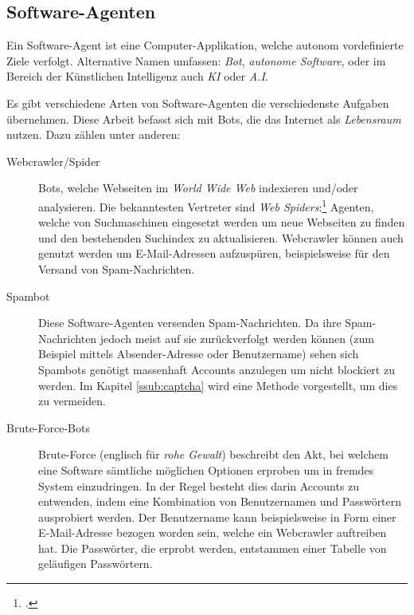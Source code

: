 \subsection{Software-Agenten} %
\label{sub:software_agenten}
Ein Software-Agent ist eine Computer-Applikation, welche autonom vordefinierte
Ziele verfolgt. Alternative Namen umfassen: \emph{Bot}, \emph{autonome
Software}, oder im Bereich der Künstlichen Intelligenz auch \emph{KI} oder
\emph{A.I}.

Es gibt verschiedene Arten von Software-Agenten die verschiedenste Aufgaben
übernehmen. Diese Arbeit befasst sich mit Bots, die das Internet als
\emph{Lebensraum} nutzen. Dazu zählen unter anderen:

\begin{description}
  \item[Webcrawler/Spider]\label{term:spider}
  Bots, welche Webseiten im \emph{World Wide Web} indexieren und/oder
  analysieren. Die bekanntesten Vertreter sind \emph{Web
  Spiders}:\footcite{wa:tkWWWRobot} Agenten, welche von Suchmaschinen eingesetzt
  werden um neue Webseiten zu finden und den bestehenden Suchindex zu
  aktualisieren. Webcrawler können auch genutzt werden um E-Mail-Adressen
  aufzuspüren, beispielsweise für den Versand von Spam-Nachrichten.
  
  \item[Spambot]
  Diese Software-Agenten versenden Spam-Nachrichten. Da ihre Spam-Nachrichten
  jedoch meist auf sie zurückverfolgt werden können (zum Beispiel mittels
  Absender-Adresse oder Benutzername) sehen sich Spambots genötigt massenhaft
  Accounts anzulegen um nicht blockiert zu werden. Im Kapitel
  \ref{ssub:captcha} wird eine Methode vorgestellt, um dies zu vermeiden.
  
  \item[Brute-Force-Bots]
  Brute-Force (englisch für \emph{rohe Gewalt}) beschreibt den Akt, bei welchem
  eine Software sämtliche möglichen Optionen erproben um in fremdes System
  einzudringen. In der Regel besteht dies darin Accounts zu entwenden, indem
  eine Kombination von Benutzernamen und Passwörtern ausprobiert werden. Der
  Benutzername kann beispielsweise in Form einer E-Mail-Adresse bezogen worden
  sein, welche ein Webcrawler auftreiben hat. Die Passwörter, die erprobt
  werden, entstammen einer Tabelle von geläufigen Passwörtern.
\end{description}
